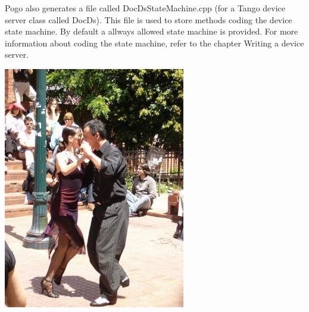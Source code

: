 Pogo also generates a file called \textquotedbl{}DocDsStateMachine.cpp\textquotedbl{}
(for a Tango device server class called DocDs). This file is used
to store methods coding the device state machine. By default a allways
allowed state machine is provided. For more information about coding
the state machine, refer to the chapter \textquotedbl{}Writing a device
server\textquotedbl{}.

\newpage{}

\vspace{5cm}


\begin{center}
\label{APicture}\includegraphics{dance/tg_argentine}
\par\end{center}
